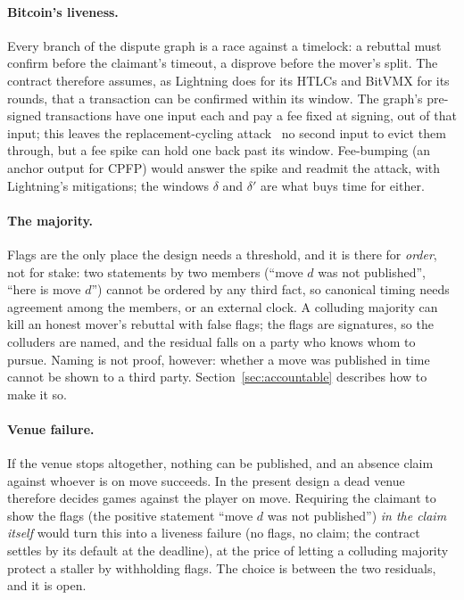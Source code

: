 \documentclass[11pt]{article}
\begin{document}
\paragraph{Bitcoin's liveness.} Every branch of the dispute graph is a
race against a timelock: a rebuttal must confirm before the
claimant's timeout, a disprove before the mover's split. The contract
therefore assumes, as Lightning does for its HTLCs and BitVMX for its
rounds, that a transaction can be confirmed within its window. The
graph's pre-signed transactions have one input each and pay a fee fixed
at signing, out of that input; this leaves the replacement-cycling
attack~\cite{cycling} no second input to evict them through, but a fee
spike can hold one back past its window. Fee-bumping (an anchor output
for CPFP) would answer the spike and readmit the attack, with
Lightning's mitigations; the windows $\delta$ and $\delta'$ are what
buys time for either.

\paragraph{The majority.} Flags are the only place the design needs a
threshold, and it is there for \emph{order}, not for stake: two statements
by two members (``move $d$ was not published'', ``here is move $d$'')
cannot be ordered by any third fact, so canonical timing needs agreement
among the members, or an external clock. A colluding majority can kill
an honest mover's rebuttal with false flags; the flags are signatures,
so the colluders are named, and the residual falls on a party who knows
whom to pursue. Naming is not proof, however: whether a move was
published in time cannot be shown to a third party.
Section~\ref{sec:accountable} describes how to make it so.

\paragraph{Venue failure.} If the venue stops altogether, nothing can
be published, and an absence claim against whoever is on move succeeds.
In the present design a dead venue therefore decides games against the
player on move. Requiring the claimant to show the flags (the positive
statement ``move $d$ was not published'') \emph{in the claim itself} would turn
this into a liveness failure (no flags, no claim; the contract settles by
its default at the deadline), at the price of letting a colluding
majority protect a staller by withholding flags. The choice is between
the two residuals, and it is open.
\end{document}
